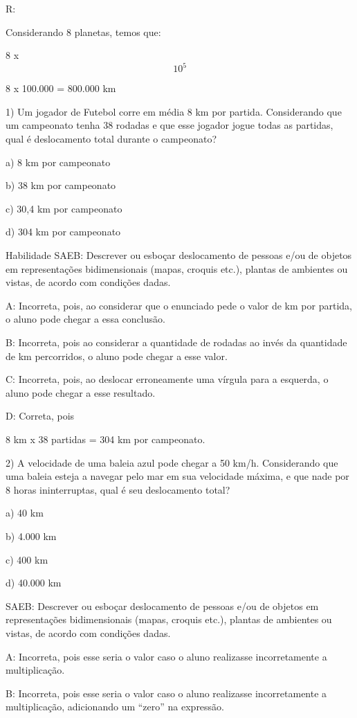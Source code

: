 R:

Considerando 8 planetas, temos que:

8 x \[10^5\]

8 x 100.000 = 800.000 km


1) Um jogador de Futebol corre em média 8 km por partida. Considerando
que um campeonato tenha 38 rodadas e que esse jogador jogue todas as
partidas, qual é deslocamento total durante o campeonato?

a) 8 km por campeonato

b) 38 km por campeonato

c) 30,4 km por campeonato

d) 304 km por campeonato

Habilidade SAEB: Descrever ou esboçar deslocamento de pessoas e/ou de
objetos em representações bidimensionais (mapas, croquis etc.), plantas
de ambientes ou vistas, de acordo com condições dadas.

A: Incorreta, pois, ao considerar que o enunciado pede o valor de km por
partida, o aluno pode chegar a essa conclusão.

B: Incorreta, pois ao considerar a quantidade de rodadas ao invés da
quantidade de km percorridos, o aluno pode chegar a esse valor.

C: Incorreta, pois, ao deslocar erroneamente uma vírgula para a
esquerda, o aluno pode chegar a esse resultado.

D: Correta, pois

8 km x 38 partidas = 304 km por campeonato.

2) A velocidade de uma baleia azul pode chegar a 50 km/h. Considerando
que uma baleia esteja a navegar pelo mar em sua velocidade máxima, e que
nade por 8 horas ininterruptas, qual é seu deslocamento total?

a) 40 km

b) 4.000 km

c) 400 km

d) 40.000 km

SAEB: Descrever ou esboçar deslocamento de pessoas e/ou de objetos em
representações bidimensionais (mapas, croquis etc.), plantas de
ambientes ou vistas, de acordo com condições dadas.

A: Incorreta, pois esse seria o valor caso o aluno realizasse
incorretamente a multiplicação.

B: Incorreta, pois esse seria o valor caso o aluno realizasse
incorretamente a multiplicação, adicionando um ``zero'' na expressão.

